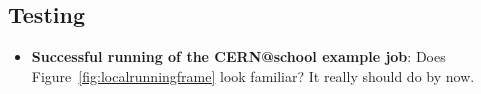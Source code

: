 \subsection{Testing}
\label{using-grid-based-data-in-your-workflow---testing}

\begin{itemize}
\tightlist
\item
  \textbf{Successful running of the CERN@school example job}: Does
  Figure~\ref{fig:localrunningframe} look familiar? It really should do by now.
\end{itemize}
